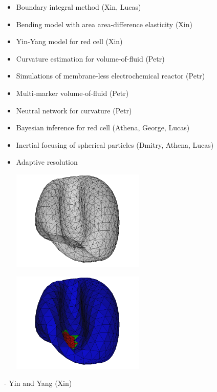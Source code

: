 \begin{itemize}
\item Boundary integral method (Xin, Lucas)
\item Bending model with area area-difference elasticity (Xin)
\item Yin-Yang model for red cell (Xin)
\item Curvature estimation for volume-of-fluid (Petr)
\item Simulations of membrane-less electrochemical reactor (Petr)
\item Multi-marker volume-of-fluid (Petr)
\item Neutral network for curvature (Petr)
\item Bayesian inference for red cell (Athena, George, Lucas)
\item Inertial focusing of spherical particles (Dmitry, Athena, Lucas)
\end{itemize}
\eframe

\begin{itemize}
\item Adaptive resolution
\begin{center}
  \includegraphics[width=0.5\textwidth]{i/b.png}
\end{center}
\begin{center}
  \includegraphics[width=0.5\textwidth]{i/a.png}
\end{center}
\end{itemize}
\eframe

- Yin and Yang (Xin)
\eframe
